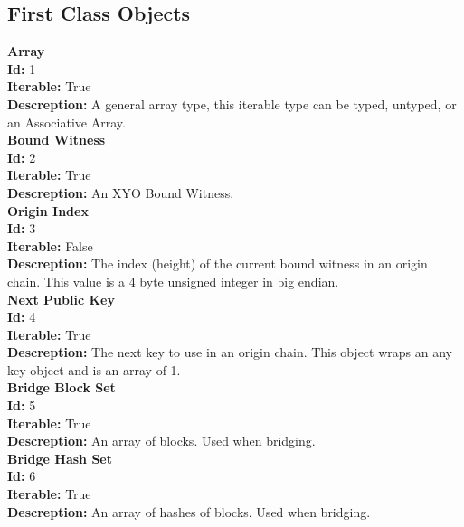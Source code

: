 \documentclass[11pt]{article}
\begin{document}
\subsection{First Class Objects}
\noindent
\textbf{Array} \\
\indent \textbf{Id:} 1 \\
\indent \textbf{Iterable:} True \\
\indent \textbf{Descreption:} A general array type, this iterable type can be typed, untyped, or an Associative Array. \\

\noindent
\textbf{Bound Witness} \\
\indent \textbf{Id:} 2 \\
\indent \textbf{Iterable:} True \\
\indent \textbf{Descreption:} An XYO Bound Witness. \\

\noindent
\textbf{Origin Index} \\
\indent \textbf{Id:} 3 \\
\indent \textbf{Iterable:} False \\
\indent \textbf{Descreption:} The index (height) of the current bound witness in an origin chain. This value is a 4 byte unsigned integer in big endian.\\

\noindent
\textbf{Next Public Key} \\
\indent \textbf{Id:} 4 \\
\indent \textbf{Iterable:} True \\
\indent \textbf{Descreption:} The next key to use in an origin chain. This object wraps an any key object and is an array of 1.  \\

\noindent
\textbf{Bridge Block Set} \\
\indent \textbf{Id:} 5 \\
\indent \textbf{Iterable:} True \\
\indent \textbf{Descreption:} An array of blocks. Used when bridging. \\

\noindent
\textbf{Bridge Hash Set} \\
\indent \textbf{Id:} 6 \\
\indent \textbf{Iterable:} True \\
\indent \textbf{Descreption:} An array of hashes of blocks. Used when bridging. \\
\end{document}

